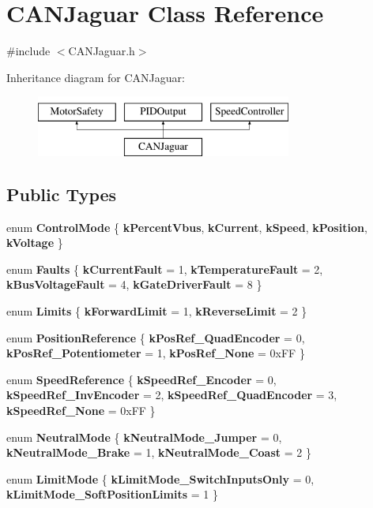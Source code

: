\hypertarget{classCANJaguar}{\section{\-C\-A\-N\-Jaguar \-Class \-Reference}
\label{classCANJaguar}
}


{\ttfamily \#include $<$\-C\-A\-N\-Jaguar.\-h$>$}

\-Inheritance diagram for \-C\-A\-N\-Jaguar\-:\begin{figure}[H]
\begin{center}
\leavevmode
\includegraphics[height=2.000000cm]{classCANJaguar}
\end{center}
\end{figure}
\subsection*{\-Public \-Types}
\begin{DoxyCompactItemize}
\item 
enum {\bfseries \-Control\-Mode} \{ \*
{\bfseries k\-Percent\-Vbus}, 
{\bfseries k\-Current}, 
{\bfseries k\-Speed}, 
{\bfseries k\-Position}, 
\*
{\bfseries k\-Voltage}
 \}
\item 
enum {\bfseries \-Faults} \{ {\bfseries k\-Current\-Fault} =  1, 
{\bfseries k\-Temperature\-Fault} =  2, 
{\bfseries k\-Bus\-Voltage\-Fault} =  4, 
{\bfseries k\-Gate\-Driver\-Fault} =  8
 \}
\item 
enum {\bfseries \-Limits} \{ {\bfseries k\-Forward\-Limit} =  1, 
{\bfseries k\-Reverse\-Limit} =  2
 \}
\item 
enum {\bfseries \-Position\-Reference} \{ {\bfseries k\-Pos\-Ref\-\_\-\-Quad\-Encoder} =  0, 
{\bfseries k\-Pos\-Ref\-\_\-\-Potentiometer} =  1, 
{\bfseries k\-Pos\-Ref\-\_\-\-None} =  0x\-F\-F
 \}
\item 
enum {\bfseries \-Speed\-Reference} \{ {\bfseries k\-Speed\-Ref\-\_\-\-Encoder} =  0, 
{\bfseries k\-Speed\-Ref\-\_\-\-Inv\-Encoder} =  2, 
{\bfseries k\-Speed\-Ref\-\_\-\-Quad\-Encoder} =  3, 
{\bfseries k\-Speed\-Ref\-\_\-\-None} =  0x\-F\-F
 \}
\item 
enum {\bfseries \-Neutral\-Mode} \{ {\bfseries k\-Neutral\-Mode\-\_\-\-Jumper} =  0, 
{\bfseries k\-Neutral\-Mode\-\_\-\-Brake} =  1, 
{\bfseries k\-Neutral\-Mode\-\_\-\-Coast} =  2
 \}
\item 
enum {\bfseries \-Limit\-Mode} \{ {\bfseries k\-Limit\-Mode\-\_\-\-Switch\-Inputs\-Only} =  0, 
{\bfseries k\-Limit\-Mode\-\_\-\-Soft\-Position\-Limits} =  1
 \}
\end{DoxyCompactItemize}
